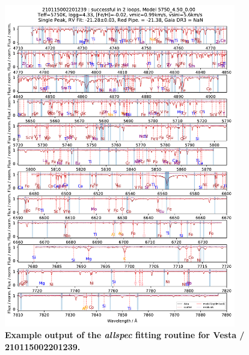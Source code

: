 \documentclass[
  journal=pasa,
  manuscript=research-paper, %
  year=2023,
  volume=37
]{cup-journal}
\begin{document}
\begin{figure}[ht]
 \centering
 \includegraphics[width=0.9\textwidth]{figures/210115002201239_single_fit_comparison.pdf} \caption{\textbf{Example output of the \textit{allspec} fitting routine for Vesta / 210115002201239.}} \label{fig:210115002201239_single_fit_comparison}
\end{figure}
\end{document}

